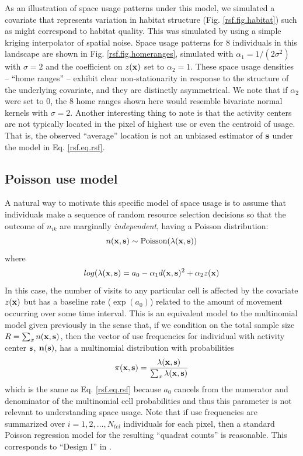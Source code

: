 \documentclass[12pt]{article}
\begin{document}
As an illustration of space usage patterns under this model, we
simulated a covariate that represents variation in habitat structure
(Fig. \ref{rsf.fig.habitat}) such as might correspond to habitat
quality.
This was simulated by using a
simple kriging interpolator  of spatial noise.
Space usage patterns for
 8 individuals in this landscape are shown in Fig. \ref{rsf.fig.homeranges},
simulated with $\alpha_{1} = 1/(2\sigma^2)$ with $\sigma = 2$ and the
coefficient on $z({\bf x})$ set to $\alpha_{2} = 1$.
These space usage densities -- ``home ranges'' -- exhibit clear
non-stationarity in response to the structure of the underlying
covariate, and they are distinctly asymmetrical.  We note that if
$\alpha_{2}$ were set to 0, the 8 home ranges shown here would
resemble bivariate normal kernels with $\sigma = 2$.  Another
interesting thing to note is that the activity centers are not
typically located in the pixel of highest use or even the centroid of
usage. That is, the observed ``average'' location is not an unbiased
estimator of ${\bf s}$ under the model in Eq. \ref{rsf.eq.rsf}.


\subsection{Poisson use model}

A natural way to motivate this specific model of space usage is to
assume that individuals make a sequence of random resource selection
decisions so that the outcome of $n_{ik}$ are marginally {\it
  independent}, having a Poisson distribution:
\[
 n({\bf x},{\bf s}) \sim \mbox{Poisson}( \lambda({\bf x},{\bf s}))
\]
where 
\[
 log(\lambda({\bf x},{\bf s}) = a_{0} -\alpha_{1} d({\bf x},{\bf s})^{2} +  \alpha_{2} z({\bf x})
\]
 In this case, the number of visits to any particular cell is affected
by the covariate $z({\bf x})$ but has a baseline rate ($\exp(a_{0})$)
related to the amount of movement occurring over some time interval.
This is an equivalent model to the multinomial
model given previously in the sense that, if we condition on the total
sample size $R = \sum_{x} n({\bf x},{\bf s})$, then the vector of use
frequencies for individual with activity center ${\bf s}$, ${\bf
  n}({\bf s})$, 
has a multinomial distribution with probabilities
\[
 \pi({\bf x},{\bf s}) = \frac{\lambda({\bf x},{\bf s})}{\sum_{x}
   \lambda({\bf x},{\bf s})}
\]
which is the same as Eq. \ref{rsf.eq.rsf}
 because $a_{0}$ cancels
from the numerator and denominator of the
multinomial cell probabilities
and thus this parameter is not relevant to understanding
space usage.
Note that if use frequencies are summarized over $i=1,2,\ldots,N_{tel}$ individuals for
each pixel, then
 a standard Poisson regression model for the resulting  ``quadrat
 counts'' is reasonable. This corresponds to  ``Design I'' in \citet{manly_etal:2002}.
\end{document}
